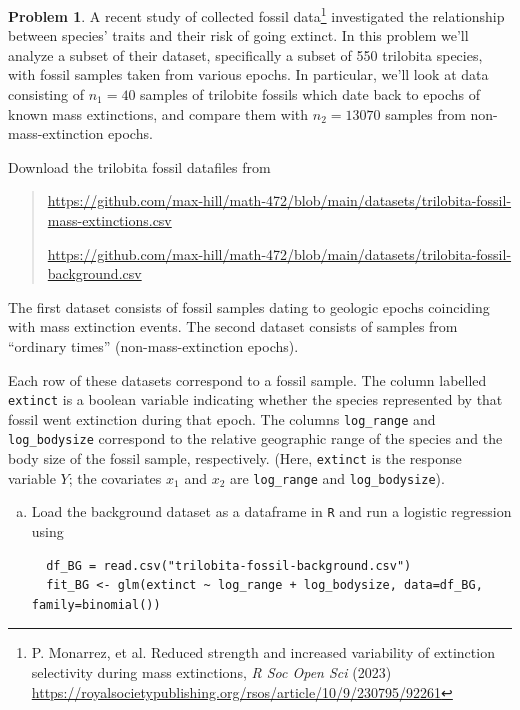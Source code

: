 \documentclass[10pt]{article}
\theoremstyle{definition}
\newtheorem{problem}[theorem]{Problem}
\newcommand{\1}[1]{\textbf{1}_{\left[#1\right]}} %
\begin{document}
\begin{problem}
  A recent study of collected fossil data\footnote{P. Monarrez, et al. Reduced
    strength and increased variability of extinction selectivity during mass
    extinctions, \textit{R Soc Open Sci} (2023)
    \url{https://royalsocietypublishing.org/rsos/article/10/9/230795/92261}}
  investigated the relationship between species' traits and their risk of
  going extinct. In this problem we'll analyze a subset of their dataset,
  specifically a subset of 550 trilobita species, with fossil samples taken
  from various epochs. In particular, we'll look at data consisting of
  $n_{1}=40$ samples of trilobite fossils which date back to epochs of known
  mass extinctions, and compare them with $n_{2}=13070$ samples from
  non-mass-extinction epochs.

  Download the trilobita fossil datafiles from

  \begin{quote}
    {\footnotesize\url{https://github.com/max-hill/math-472/blob/main/datasets/trilobita-fossil-mass-extinctions.csv}}

    {\footnotesize\url{https://github.com/max-hill/math-472/blob/main/datasets/trilobita-fossil-background.csv}}

  \end{quote}
  The first dataset consists of fossil samples dating to geologic epochs
  coinciding with mass extinction events. The second dataset consists of
  samples from ``ordinary times'' (non-mass-extinction epochs).
  
  Each row of these datasets correspond to a fossil sample. The column
  labelled \texttt{extinct} is a boolean variable indicating whether the
  species represented by that fossil went extinction during that epoch. The
  columns \texttt{log\_range} and \texttt{log\_bodysize} correspond to the
  relative geographic range of the species and the body size of the fossil
  sample, respectively. (Here, \texttt{extinct} is the response variable $Y$;
  the covariates $x_{1}$ and $x_{2}$ are \texttt{log\_range} and
  \texttt{log\_bodysize}).
  
  
  \begin{enumerate}[(a)]
    \item Load the background dataset as a dataframe in \texttt{R} and run a
    logistic regression using

\begin{verbatim}
  df_BG = read.csv("trilobita-fossil-background.csv")
  fit_BG <- glm(extinct ~ log_range + log_bodysize, data=df_BG, family=binomial())
\end{verbatim}


\end{enumerate}
\end{problem}
\end{document}
